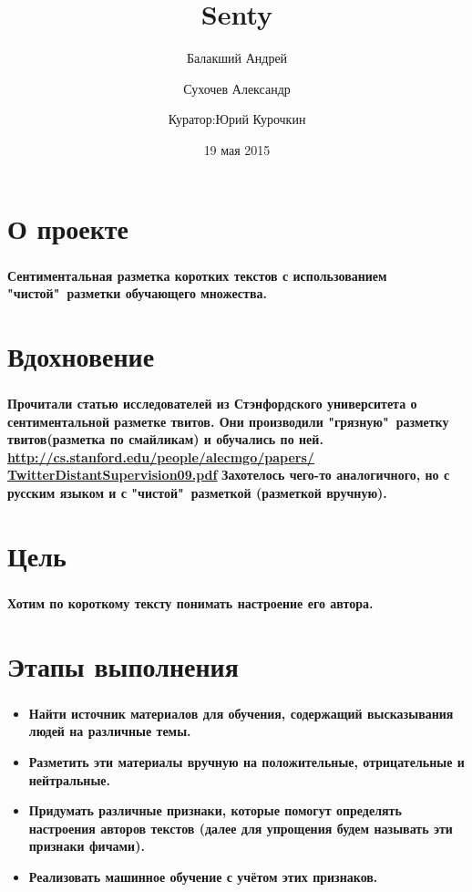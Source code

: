 \documentclass[t]{beamer}
\title{Senty}
\author{Балакший Андрей \and Сухочев Александр 
	\and \newline Куратор:Юрий Курочкин}
\date{19 мая 2015}
\institute[Computer Science Center]
\begin{document}
	\frame[plain]{\titlepage}
	
	
	\section{О проекте}
	\begin{frame}
		\frametitle{\insertsection}
		\textbf{Сентиментальная разметка коротких текстов с использованием "чистой"\ разметки обучающего множества.}
	\end{frame}
	
	
	\section{Вдохновение}
	\begin{frame}
		\frametitle{\insertsection}
		\textbf{Прочитали статью исследователей из Стэнфордского университета о сентиментальной разметке твитов. Они производили "грязную"\ разметку твитов(разметка по смайликам) и обучались по ней. \newline \newline}
		\hyperref[http://cs.stanford.edu/people/alecmgo/papers/TwitterDistantSupervision09.pdf]{\textbf{\underline{http://cs.stanford.edu/people/alecmgo/papers/} \newline \underline{TwitterDistantSupervision09.pdf}}} \pause
		\newline
		\newline
		\textbf{Захотелось чего-то аналогичного, но с русским языком и с "чистой"\ разметкой (разметкой вручную).}
	\end{frame}
	
	
	\section{Цель}
	\begin{frame}
		\frametitle{\insertsection}
		\textbf{Хотим по короткому тексту понимать настроение его автора.}
	\end{frame}
	
	
	\section{Этапы выполнения}
	\begin{frame}
		
		\frametitle{\insertsection}
		\begin{itemize}
			\item \textbf{Найти источник материалов для обучения, содержащий высказывания людей на различные темы.}	
			\item \textbf{Разметить эти материалы вручную на положительные, отрицательные и нейтральные.}
			\item \textbf{Придумать различные признаки, которые помогут определять настроения авторов текстов (далее для упрощения будем называть эти признаки фичами).}
			\item \textbf{Реализовать машинное обучение с учётом этих признаков.} 
		\end{itemize}
	\end{frame}
	
\end{document}

